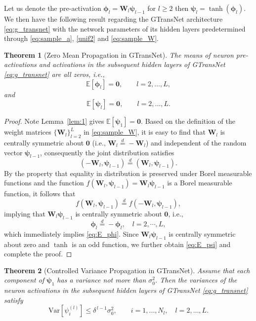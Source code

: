\documentclass{article}
\newcommand{\bW}{\mathbf{W}}
\newcommand{\vphi}{\boldsymbol{\phi}}
\newcommand{\vpsi}{\boldsymbol{\psi}}
\newtheorem{theorem}{Theorem}
\begin{document}
 
Let us denote the pre-activation $\vphi_l=\bW_l\vpsi_{l-1}$ for $l\ge 2$ then $\vpsi_l=\tanh(\vphi_l)$. 
We then have the following result regarding the GTransNet architecture  \eqref{eq:g_transnet} with the network parameters of its hidden layers predetermined through 
\eqref{eq:sample_a},  \eqref{unif2} and \eqref{eq:sample_W}.

\begin{theorem}[Zero Mean Propagation in GTransNet]\label{lem:CS} 
The means of  neuron pre-activations and activations in  the subsequent hidden layers of GTransNet \eqref{eq:g_transnet}  are all zeros, i.e.,
\begin{equation}\label{eq:E_phi}
\mathbb{E}[\vphi_l] = \mathbf{0}, \qquad l=2,\dots,L,
\end{equation}
and
\begin{equation}\label{eq:E_psi}
\mathbb{E}[\vpsi_l] = \mathbf{0}, \qquad l=2,\dots,L.
\end{equation}
\end{theorem}

\begin{proof} 
Note Lemma~\ref{lem:1} gives 
$\mathbb{E}[\vpsi_1] = \mathbf{0}.$
Based on the definition of the weight matrices $\{\bW_l\}_{l=2}^{L}$ in \eqref{eq:sample_W}, it is easy to find that 
$\bW_l$ is centrally symmetric about $\mathbf 0$ (i.e., $\bW_l \stackrel{d}{=} -\bW_l$)
and independent of the random vector $\vpsi_{l-1}$, consequently the joint distribution satisfies
\[
(-\bW_l, \vpsi_{l-1}) \stackrel{d}{=} (\bW_l, \vpsi_{l-1}).
\] 
By the property that equality in distribution is preserved under Borel measurable functions and the function $f(\bW_l, \vpsi_{l-1}) = \bW_l \vpsi_{l-1}$ is a Borel measurable function, it follows that
\[
f(\bW_l, \vpsi_{l-1}) \stackrel{d}{=}  f(-\bW_l, \vpsi_{l-1}),
\]
implying that $\bW_l \vpsi_{l-1}$ is centrally symmetric about $\mathbf{0}$, 
i.e., 
\begin{equation*}
\vphi_{l} \stackrel{d}{=} -\vphi_{l}, \quad l=2,\cdots,L,
\end{equation*}
which immediately implies \eqref{eq:E_phi}. 
Since $\bW_l\vpsi_{l-1}$ is centrally symmetric about zero and $\tanh$ is an odd function, we further obtain \eqref{eq:E_psi} and complete the proof. 
\end{proof}

\begin{theorem}[Controlled Variance Propagation in GTransNet]\label{thm:1}
Assume that each component of $\vpsi_1$ has a variance not more than $\sigma_0^2$. 
Then the variances of the neuron activations  in  the subsequent hidden layers of GTransNet \eqref{eq:g_transnet}  satisfy
\begin{equation}\label{eq:var_psi}
\mathrm{Var}[\psi_i^{(l)}] \le \delta^{\,l-1}\sigma_0^2,
\qquad i=1,\dots,N_l,\quad l=2,\dots,L.
\end{equation} 
\end{theorem}
\end{document}

